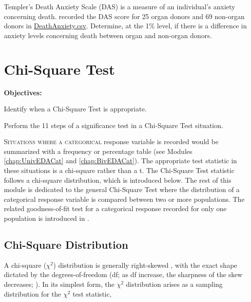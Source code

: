 \documentclass[10pt,openany]{book}\usepackage[]{graphicx}\usepackage[]{color}
\begin{document}
\begin{exsection}
  \item \label{revex:tTestDAS} \rhw{} Templer's Death Anxiety Scale (DAS) is a measure of an individual's anxiety concerning death.  \cite{Robbins1990} recorded the DAS score for 25 organ donors and 69 non-organ donors in \href{https://raw.githubusercontent.com/droglenc/NCData/master/DeathAnxiety.csv}{DeathAnxiety.csv}. Determine, at the 1\% level, if there is a difference in anxiety levels concerning death between organ and non-organ donors. 
  \vspace{-6pt}
\end{exsection}



\chapter[Chi-Square Test]{Chi-Square Test} \label{chap:ChiSquare}

\begin{ChapObj}{\boxwidth}
  \textbf{Objectives:}
  \begin{Enumerate}
    \item Identify when a Chi-Square Test is appropriate.
    \item Perform the 11 steps of a significance test in a Chi-Square Test situation.
  \end{Enumerate}
\end{ChapObj}

\minitoc
\vspace{12pt}

\lettrine{S}{ituations where a categorical} response variable is recorded would be summarized with a frequency or percentage table (see Modules \ref{chap:UnivEDACat} and \ref{chap:BivEDACat}).  The appropriate test statistic in these situations is a chi-square rather than a t.  The Chi-Square Test statistic follows a chi-square distribution, which is introduced below.  The rest of this module is dedicated to the general Chi-Square Test where the distribution of a categorical response variable is compared between two or more populations. The related goodness-of-fit test for a categorical response recorded for only one population is introduced in .

\vspace{-12pt}
\section{Chi-Square Distribution}\label{sect:ChiDist}
\vspace{-12pt}
A chi-square ($\chi^2$) distribution is generally right-skewed , with the exact shape dictated by the degrees-of-freedom (df; as df increase, the sharpness of the skew decreases; ). In its simplest form, the $\chi^2$ distribution arises as a sampling distribution for the $\chi^2$ test statistic,
\end{document}
